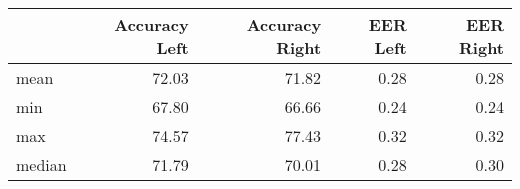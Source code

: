\begin{tabular}{lrrrr}
\toprule
{} &  Accuracy Left &  Accuracy Right &  EER Left &  EER Right \\
\midrule
mean   &          72.03 &           71.82 &      0.28 &       0.28 \\
min    &          67.80 &           66.66 &      0.24 &       0.24 \\
max    &          74.57 &           77.43 &      0.32 &       0.32 \\
median &          71.79 &           70.01 &      0.28 &       0.30 \\
\bottomrule
\end{tabular}
